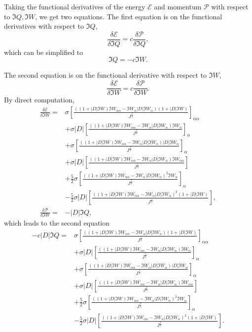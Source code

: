 \documentclass[12pt]{amsart}
\theoremstyle{remark}
\theoremstyle{definition}
\numberwithin{equation}{section}
\newcommand{\al}{\alpha}
\newcommand{\f}{\frac}
\begin{document}
Taking the functional derivatives of the energy $\mathcal{E}$ and momentum $\mathcal{P}$ with respect to $\Im Q, \Im W$,  we get two equations.
The first equation is on the functional derivatives with respect to $\Im Q$,
\begin{equation*}
\frac{\delta \mathcal{E}}{\delta \Im Q} = c \frac{\delta \mathcal{P}}{\delta \Im Q},
\end{equation*}
which can be simplified to
\begin{equation}
\Im Q =  - c\Im W. \label{BabenkoQ}
\end{equation}

The second equation is on the functional derivative with respect to $\Im W$, 
\begin{equation*}
\frac{\delta \mathcal{E}}{\delta \Im W} = c \frac{\delta \mathcal{P}}{\delta \Im W}.
\end{equation*}
By direct computation,
\begin{align*}
 \frac{\delta \mathcal{E}}{\delta \Im W}=&\sigma\left[\frac{((1+|D|\Im W) \Im W_{\al \al} - \Im W_\al |D|\Im W_\al)(1+|D|\Im W)}{J^\f52}\right]_{\al\al}\\
&+\sigma|D|\left[\frac{((1+|D|\Im W) \Im W_{\al \al} - \Im W_\al |D|\Im W_\al)\Im W_{\al}}{J^\f52}\right]_{\al}\\
&+\sigma\left[\frac{((1+|D|\Im W) \Im W_{\al \al} - \Im W_\al |D|\Im W_\al)|D|\Im W_{\al}}{J^\f52}\right]_{\al}\\
&+\sigma|D|\left[\frac{((1+|D|\Im W) \Im W_{\al \al} - \Im W_\al |D|\Im W_\al)\Im W_{\al\al}}{J^\f52}\right]\\
&+\f52\sigma\left[\frac{((1+|D|\Im W) \Im W_{\al \al} - \Im W_\al |D|\Im W_\al)^2\Im W_{\al}}{J^\f72}\right]_{\al}\\
&-\f52\sigma|D|\left[\frac{((1+|D|\Im W) \Im W_{\al \al} - \Im W_\al |D|\Im W_\al)^2(1+|D|\Im W)}{J^\f72}\right],\\
  \frac{\delta \mathcal{P}}{\delta \Im W} =& -|D|\Im Q,
\end{align*}
which leads to the second equation
\begin{align*}
-c|D|\Im Q=&\sigma\left[\frac{((1+|D|\Im W) \Im W_{\al \al} - \Im W_\al |D|\Im W_\al)(1+|D|\Im W)}{J^\f52}\right]_{\al\al}\\
&+\sigma|D|\left[\frac{((1+|D|\Im W) \Im W_{\al \al} - \Im W_\al |D|\Im W_\al)\Im W_{\al}}{J^\f52}\right]_{\al}\\
&+\sigma\left[\frac{((1+|D|\Im W) \Im W_{\al \al} - \Im W_\al |D|\Im W_\al)|D|\Im W_{\al}}{J^\f52}\right]_{\al}\\
&+\sigma|D|\left[\frac{((1+|D|\Im W) \Im W_{\al \al} - \Im W_\al |D|\Im W_\al)\Im W_{\al\al}}{J^\f52}\right]\\
&+\f52\sigma\left[\frac{((1+|D|\Im W) \Im W_{\al \al} - \Im W_\al |D|\Im W_\al)^2\Im W_{\al}}{J^\f72}\right]_{\al}\\
&-\f52\sigma|D|\left[\frac{((1+|D|\Im W) \Im W_{\al \al} - \Im W_\al |D|\Im W_\al)^2(1+|D|\Im W)}{J^\f72}\right].   
\end{align*}
\end{document}
